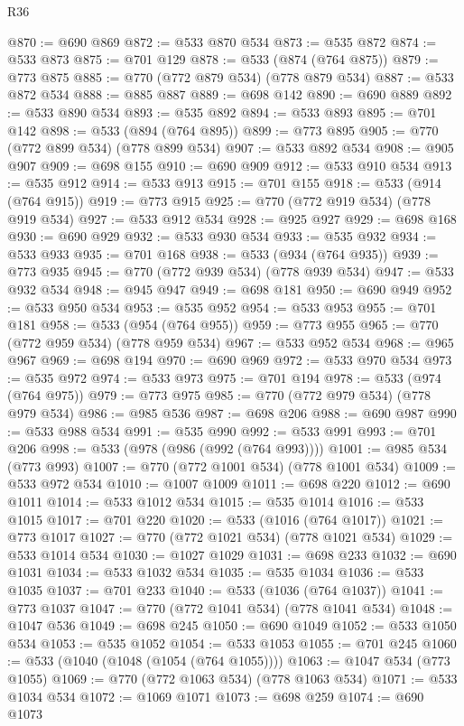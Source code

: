 \begin{lexlean}{R36}
\begin{coremodule}
@870 := @690 @869
@872 := @533 @870 @534
@873 := @535 @872
@874 := @533 @873
@875 := @701 @129
@878 := @533 (@874 (@764 @875))
@879 := @773 @875
@885 := @770 (@772 @879 @534) (@778 @879 @534)
@887 := @533 @872 @534
@888 := @885 @887
@889 := @698 @142
@890 := @690 @889
@892 := @533 @890 @534
@893 := @535 @892
@894 := @533 @893
@895 := @701 @142
@898 := @533 (@894 (@764 @895))
@899 := @773 @895
@905 := @770 (@772 @899 @534) (@778 @899 @534)
@907 := @533 @892 @534
@908 := @905 @907
@909 := @698 @155
@910 := @690 @909
@912 := @533 @910 @534
@913 := @535 @912
@914 := @533 @913
@915 := @701 @155
@918 := @533 (@914 (@764 @915))
@919 := @773 @915
@925 := @770 (@772 @919 @534) (@778 @919 @534)
@927 := @533 @912 @534
@928 := @925 @927
@929 := @698 @168
@930 := @690 @929
@932 := @533 @930 @534
@933 := @535 @932
@934 := @533 @933
@935 := @701 @168
@938 := @533 (@934 (@764 @935))
@939 := @773 @935
@945 := @770 (@772 @939 @534) (@778 @939 @534)
@947 := @533 @932 @534
@948 := @945 @947
@949 := @698 @181
@950 := @690 @949
@952 := @533 @950 @534
@953 := @535 @952
@954 := @533 @953
@955 := @701 @181
@958 := @533 (@954 (@764 @955))
@959 := @773 @955
@965 := @770 (@772 @959 @534) (@778 @959 @534)
@967 := @533 @952 @534
@968 := @965 @967
@969 := @698 @194
@970 := @690 @969
@972 := @533 @970 @534
@973 := @535 @972
@974 := @533 @973
@975 := @701 @194
@978 := @533 (@974 (@764 @975))
@979 := @773 @975
@985 := @770 (@772 @979 @534) (@778 @979 @534)
@986 := @985 @536
@987 := @698 @206
@988 := @690 @987
@990 := @533 @988 @534
@991 := @535 @990
@992 := @533 @991
@993 := @701 @206
@998 := @533 (@978 (@986 (@992 (@764 @993))))
@1001 := @985 @534 (@773 @993)
@1007 := @770 (@772 @1001 @534) (@778 @1001 @534)
@1009 := @533 @972 @534
@1010 := @1007 @1009
@1011 := @698 @220
@1012 := @690 @1011
@1014 := @533 @1012 @534
@1015 := @535 @1014
@1016 := @533 @1015
@1017 := @701 @220
@1020 := @533 (@1016 (@764 @1017))
@1021 := @773 @1017
@1027 := @770 (@772 @1021 @534) (@778 @1021 @534)
@1029 := @533 @1014 @534
@1030 := @1027 @1029
@1031 := @698 @233
@1032 := @690 @1031
@1034 := @533 @1032 @534
@1035 := @535 @1034
@1036 := @533 @1035
@1037 := @701 @233
@1040 := @533 (@1036 (@764 @1037))
@1041 := @773 @1037
@1047 := @770 (@772 @1041 @534) (@778 @1041 @534)
@1048 := @1047 @536
@1049 := @698 @245
@1050 := @690 @1049
@1052 := @533 @1050 @534
@1053 := @535 @1052
@1054 := @533 @1053
@1055 := @701 @245
@1060 := @533 (@1040 (@1048 (@1054 (@764 @1055))))
@1063 := @1047 @534 (@773 @1055)
@1069 := @770 (@772 @1063 @534) (@778 @1063 @534)
@1071 := @533 @1034 @534
@1072 := @1069 @1071
@1073 := @698 @259
@1074 := @690 @1073

\end{coremodule}
\end{lexlean}
